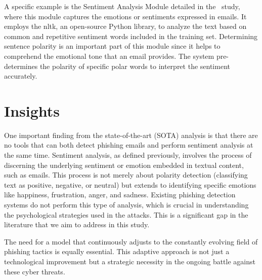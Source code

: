 A specific example is the Sentiment Analysis Module detailed in the~\citet{10085351} study, where this module captures the emotions or sentiments expressed in emails. It employs the \ac{nltk}, an open-source Python library, to analyze the text based on common and repetitive sentiment words included in the training set. Determining sentence polarity is an important part of this module since it helps to comprehend the emotional tone that an email provides. The system pre-determines the polarity of specific polar words to interpret the sentiment accurately. 



\section{Insights}

One important finding from the state-of-the-art (SOTA) analysis is that there are no tools that can both detect phishing emails and perform sentiment analysis at the same time. Sentiment analysis, as defined previously, involves the process of discerning the underlying sentiment or emotion embedded in textual content, such as emails. This process is not merely about polarity detection (classifying text as positive, negative, or neutral) but extends to identifying specific emotions like happiness, frustration, anger, and sadness. Existing phishing detection systems do not perform this type of analysis, which is crucial in understanding the psychological strategies used in the attacks. This is a significant gap in the literature that we aim to address in this study.

The need for a model that continuously adjusts to the constantly evolving field of phishing tactics is equally essential. This adaptive approach is not just a technological improvement but a strategic necessity in the ongoing battle against these cyber threats.

